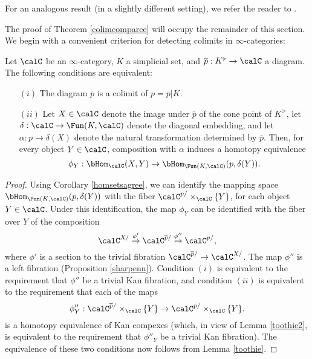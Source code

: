 \begin{remark}
For an analogous result (in a slightly different setting), we refer
the reader to \cite{hirschowitz}.
\end{remark}

The proof of Theorem \ref{colimcomparee} will occupy the remainder of this section. 
We begin with a convenient criterion for detecting colimits in $\infty$-categories:

\begin{lemma}\label{kamma}
Let $\calC$ be an $\infty$-category, $K$ a simplicial set, and
$\overline{p}: K^{\triangleright} \rightarrow \calC$ a diagram. The following conditions are equivalent:
\begin{itemize}
\item[$(i)$] The diagram $\overline{p}$ is a colimit of $p = \overline{p} | K$.
\item[$(ii)$] Let $X \in \calC$ denote the image under $\overline{p}$ of the cone point
of $K^{\triangleright}$, let $\delta: \calC \rightarrow \Fun(K,\calC)$ denote the diagonal
embedding, and let $\alpha: p \rightarrow \delta(X)$ denote the natural transformation determined by $\overline{p}$. Then, for every object $Y \in \calC$, composition with $\alpha$ induces
a homotopy equivalence
$$ \phi_{Y}: \bHom_{\calC}(X, Y) \rightarrow \bHom_{ \Fun(K,\calC) }( p, \delta(Y) ).$$
\end{itemize}
\end{lemma}

\begin{proof}
Using Corollary \ref{homsetsagree}, we can identify the mapping space
$\bHom_{\Fun(K,\calC) }( p, \delta(Y) )$ with the fiber
$\calC^{p/} \times_{\calC} \{Y\}$, for each object $Y \in \calC$.
Under this identification, the map $\phi_{Y}$ can be identified with
the fiber over $Y$ of the composition
$$ \calC^{X/} \stackrel{\phi'}{\rightarrow} \calC^{ \overline{p}/ } \stackrel{\phi''}{\rightarrow} \calC^{p/},$$
where $\phi'$ is a section to the trivial fibration $\calC^{\overline{p}/} \rightarrow \calC^{X/}$. 
The map $\phi''$ is a left fibration (Proposition \ref{sharpenn}). Condition $(i)$ is equivalent to the requirement that $\phi''$ be a trivial Kan fibration, and condition $(ii)$ is equivalent to the
requirement that each of the maps
$$ \phi''_{Y}: \calC^{ \overline{p}/} \times_{\calC} \{Y \} \rightarrow \calC^{p/} \times_{\calC} \{Y\}.$$
is a homotopy equivalence of Kan compexes (which, in view of Lemma \ref{toothie2}, is equivalent to the requirement that $\phi''_{Y}$ be a trivial Kan fibration). The equivalence of these two conditions now follows from Lemma \ref{toothie}.
\end{proof}

